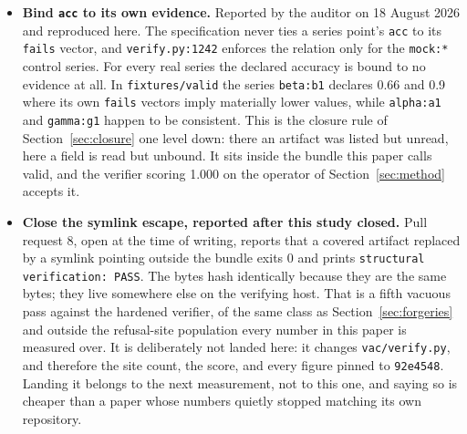 \documentclass[11pt]{article}
\begin{document}
\begin{itemize}
\item \textbf{Bind \texttt{acc} to its own evidence.} Reported by the auditor on 18 August
2026 and reproduced here. The specification never ties a series point's \texttt{acc} to its
\texttt{fails} vector, and \texttt{verify.py:1242} enforces the relation only for the
\texttt{mock:*} control series. For every real series the declared accuracy is bound to no
evidence at all. In \texttt{fixtures/valid} the series \texttt{beta:b1} declares 0.66 and 0.9
where its own \texttt{fails} vectors imply materially lower values, while \texttt{alpha:a1} and
\texttt{gamma:g1} happen to be consistent. This is the closure rule of
Section~\ref{sec:closure} one level down: there an artifact was listed but unread, here a field
is read but unbound. It sits inside the bundle this paper calls valid, and the verifier scoring
1.000 on the operator of Section~\ref{sec:method} accepts it.

\item \textbf{Close the symlink escape, reported after this study closed.} Pull request 8,
open at the time of writing, reports that a covered artifact replaced by a symlink pointing
outside the bundle exits 0 and prints \texttt{structural verification: PASS}. The bytes hash
identically because they are the same bytes; they live somewhere else on the verifying host.
That is a fifth vacuous pass against the hardened verifier, of the same class as
Section~\ref{sec:forgeries} and outside the refusal-site population every number in this paper
is measured over. It is deliberately not landed here: it changes \texttt{vac/verify.py}, and
therefore the site count, the score, and every figure pinned to \texttt{92e4548}. Landing it
belongs to the next measurement, not to this one, and saying so is cheaper than a paper whose
numbers quietly stopped matching its own repository.


\end{itemize}
\end{document}

